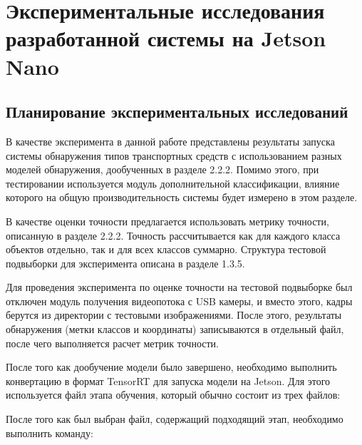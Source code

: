 \chapter{Экспериментальные исследования разработанной системы на Jetson Nano}

\section{Планирование экспериментальных исследований}

В качестве эксперимента в данной работе представлены результаты запуска системы обнаружения типов транспортных средств с использованием разных моделей обнаружения, дообученных в разделе 2.2.2. Помимо этого, при тестировании используется модуль дополнительной классификации, влияние которого на общую производительность системы будет измерено в этом разделе.

В качестве оценки точности предлагается использовать метрику точности, описанную в разделе 2.2.2. Точность рассчитывается как для каждого класса объектов отдельно, так и для всех классов суммарно. Структура тестовой подвыборки для эксперимента описана в разделе 1.3.5.

Для проведения эксперимента по оценке точности на тестовой подвыборке был отключен модуль получения видеопотока с USB камеры, и вместо этого, кадры берутся из директории с тестовыми изображениями. После этого, результаты обнаружения (метки классов и координаты) записываются в отдельный файл, после чего выполняется расчет метрик точности.

После того как дообучение модели было завершено, необходимо выполнить конвертацию в формат TensorRT для запуска модели на Jetson. Для этого используется файл этапа обучения, который обычно состоит из трех файлов:


После того как был выбран файл, содержащий подходящий этап, необходимо выполнить команду:


